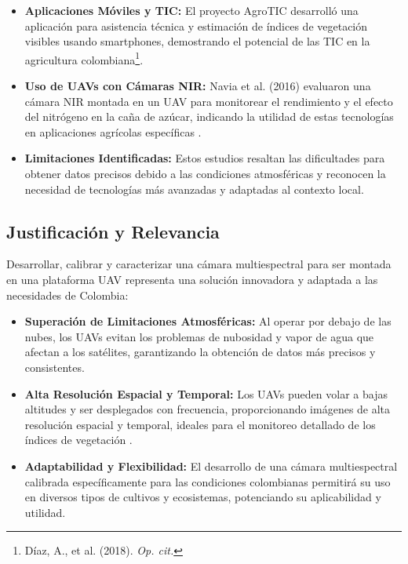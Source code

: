 \begin{itemize}
    \item \textbf{Aplicaciones Móviles y TIC:} El proyecto AgroTIC desarrolló una aplicación para asistencia técnica y estimación de índices de vegetación visibles usando smartphones, demostrando el potencial de las TIC en la agricultura colombiana\footnote{Díaz, A., et al. (2018). \textit{Op. cit.}}.

    \item \textbf{Uso de UAVs con Cámaras NIR:} Navia et al. (2016) evaluaron una cámara NIR montada en un UAV para monitorear el rendimiento y el efecto del nitrógeno en la caña de azúcar, indicando la utilidad de estas tecnologías en aplicaciones agrícolas específicas \cite{Navia2016MultispectralUAV}.

    \item \textbf{Limitaciones Identificadas:} Estos estudios resaltan las dificultades para obtener datos precisos debido a las condiciones atmosféricas y reconocen la necesidad de tecnologías más avanzadas y adaptadas al contexto local.
\end{itemize}

\subsection*{Justificación y Relevancia}

Desarrollar, calibrar y caracterizar una cámara multiespectral para ser montada en una plataforma UAV representa una solución innovadora y adaptada a las necesidades de Colombia:

\begin{itemize}
    \item \textbf{Superación de Limitaciones Atmosféricas:} Al operar por debajo de las nubes, los UAVs evitan los problemas de nubosidad y vapor de agua que afectan a los satélites, garantizando la obtención de datos más precisos y consistentes.

    \item \textbf{Alta Resolución Espacial y Temporal:} Los UAVs pueden volar a bajas altitudes y ser desplegados con frecuencia, proporcionando imágenes de alta resolución espacial y temporal, ideales para el monitoreo detallado de los índices de vegetación \cite{Castano-Marin2023EstimatingImagery}.

    \item \textbf{Adaptabilidad y Flexibilidad:} El desarrollo de una cámara multiespectral calibrada específicamente para las condiciones colombianas permitirá su uso en diversos tipos de cultivos y ecosistemas, potenciando su aplicabilidad y utilidad.
\end{itemize}

